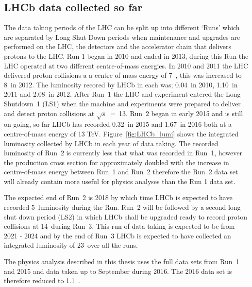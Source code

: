 \subsection{LHCb data collected so far}
\label{LHCb_data}
The data taking periods of the LHC can be split up into different `Runs' which are separated by Long Shut Down periods when maintenance and upgrades are performed on the LHC, the detectors and the accelerator chain that delivers protons to the LHC. Run 1 began in 2010 and ended in 2013, during this Run the LHC operated at two different centre-of-mass energies. In 2010 and 2011 the LHC delivered proton collisions a a centre-of-mass energy of 7~\tev, this was increased to 8~\tev in 2012. The luminosity recored by LHCb in each was; 0.04~\fb in 2010, 1.10~\fb in 2011 and 2.08~\fb in 2012. After Run~1 the LHC and experiment entered the Long Shutdown~1 (LS1) when the machine and experiments were prepared to deliver and detect proton collisions at $\sqrt{s}$~=~13. Run~2 began in early 2015 and is still on going, so far LHCb has recorded 0.32~\fb in 2015 and 1.67~\fb in 2016 both at a centre-of-mass energy of 13 TeV. Figure~\ref{fig:LHCb_lumi} shows the integrated luminosity collected by LHCb in each year of data taking. The recorded luminosity of Run~2 is currently less that what was recorded in Run~1, however the production cross section for \bhadrons approximately doubled with the increase in centre-of-mass energy between Run~1 and Run~2 therefore the Run~2 data set will already contain more \bhadrons useful for physics analyses than the Run 1 data set. 


The expected end of Run~2 is 2018 by which time LHCb is expected to have recorded 5~\fb luminosity during the Run. Run~2 will be followed by a second long shut down period (LS2) in which LHCb shall be upgraded ready to record proton collisions at 14~\tev during Run~3. This run of data taking is expected to be from 2021 - 2024 and by the end of Run~3 LHCb is expected to have collected an integrated luminosity of 23~\fb over all the runs. 

The physics analysis described in this thesis uses the full data sets from Run~1 and 2015 and data taken up to September during 2016. The 2016 data set is therefore reduced to 1.1~\fb.

